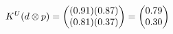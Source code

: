 \documentclass[preview]{standalone}
\begin{document}
\begin{align*}
\special{dvisvgm:raw <g id='unique000'>}K^U(d \otimes p) = \begin{pmatrix} (0.91)(0.87) \\ (0.81)(0.37) \end{pmatrix} = \begin{pmatrix} 0.79 \\ 0.30 \end{pmatrix}\special{dvisvgm:raw </g>}
\end{align*}
\end{document}

